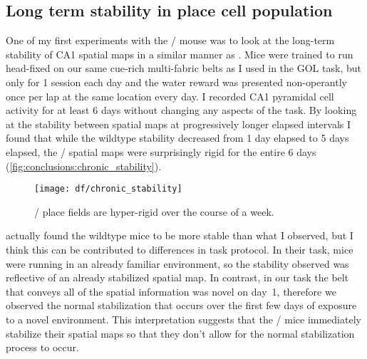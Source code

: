 \subsection{Long term stability in place cell population}
\label{sec:conclusions:chronic}
One of my first experiments with the \df/ mouse was to look at the long-term stability of CA1 spatial maps in a similar manner as \citeauthor{Ziv2013}.
Mice were trained to run head-fixed on our same cue-rich multi-fabric belts as I used in the \ac{GOL} task, but only for 1 session each day and the water reward was presented non-operantly once per lap at the same location every day.
I recorded CA1 pyramidal cell activity for at least 6 days without changing any aspects of the task.
By looking at the stability between spatial maps at progressively longer elapsed intervals I found that while the wildtype stability decreased from 1 day elapsed to 5 days elapsed, the \df/ spatial maps were surprisingly rigid for the entire 6 days (\autoref{fig:conclusions:chronic_stability}).

\begin{figure}
	\centering
	\texttt{[image: df/chronic\_stability]}
	\caption{\df/ place fields are hyper-rigid over the course of a week.}
	\label{fig:conclusions:chronic_stability}
\end{figure}

\citeauthor{Ziv2013} actually found the wildtype mice to be more stable than what I observed, but I think this can be contributed to differences in task protocol.
In their task, mice were running in an already familiar environment, so the stability observed was reflective of an already stabilized spatial map.
In contrast, in our task the belt that conveys all of the spatial information was novel on day~1, therefore we observed the normal stabilization that occurs over the first few days of exposure to a novel environment.
This interpretation suggests that the \df/ mice immediately stabilize their spatial maps so that they don't allow for the normal stabilization process to occur.

